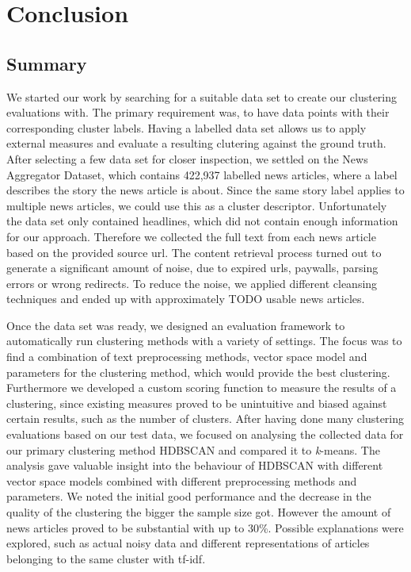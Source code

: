 \section{Conclusion}

\subsection{Summary}

We started our work by searching for a suitable data set to create our clustering evaluations with.
The primary requirement was, to have data points with their corresponding cluster labels.
Having a labelled data set allows us to apply external measures and evaluate a resulting clutering against the ground truth.
After selecting a few data set for closer inspection, we settled on the News Aggregator Dataset,
which contains 422,937 labelled news articles, where a label describes the story the news article is about.
Since the same story label applies to multiple news articles, we could use this as a cluster descriptor.
Unfortunately the data set only contained headlines, which did not contain enough information for our approach.
Therefore we collected the full text from each news article based on the provided source url.
The content retrieval process turned out to generate a significant amount of noise,
due to expired urls, paywalls, parsing errors or wrong redirects.
To reduce the noise, we applied different cleansing techniques and ended up with approximately TODO usable news articles.

Once the data set was ready, we designed an evaluation framework to automatically run clustering methods with a variety of settings.
The focus was to find a combination of text preprocessing methods,
vector space model and parameters for the clustering method, which would provide the best clustering.
Furthermore we developed a custom scoring function to measure the results of a clustering,
since existing measures proved to be unintuitive and biased against certain results,
such as the number of clusters.
After having done many clustering evaluations based on our test data,
we focused on analysing the collected data for our primary clustering method HDBSCAN and compared it to \textit{k}-means.
The analysis gave valuable insight into the behaviour of HDBSCAN with different vector space models
combined with different preprocessing methods and parameters.
We noted the initial good performance and the decrease in the quality of the clustering the bigger the sample size got.
However the amount of news articles proved to be substantial with up to 30\%.
Possible explanations were explored,
such as actual noisy data and different representations of articles belonging to the same cluster with tf-idf.

